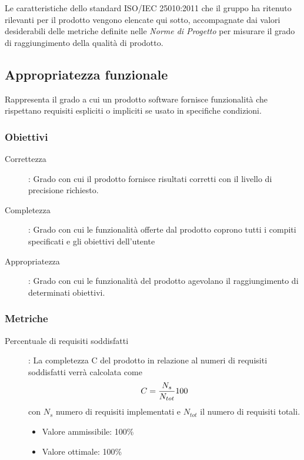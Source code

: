 \documentclass[../piano-di-qualifica.tex]{subfiles}
\begin{document}
Le caratteristiche dello standard ISO/IEC 25010:2011 che il gruppo ha ritenuto rilevanti per il prodotto vengono elencate qui sotto, accompagnate dai valori desiderabili delle metriche definite nelle \textit{Norme di Progetto} per misurare il grado di raggiungimento della qualità di prodotto.


\subsection{Appropriatezza funzionale}%
\label{sub:appropriatezza_funzionale}
  Rappresenta il grado a cui un prodotto software fornisce funzionalità che rispettano requisiti espliciti o impliciti se usato in specifiche condizioni.
  \subsubsection{Obiettivi}%
  \label{subs:obiettivi}
      \begin{description}
        \item [Correttezza]: Grado con cui il prodotto fornisce risultati corretti con il livello di precisione richiesto.
        \item [Completezza]: Grado con cui le funzionalità offerte dal prodotto coprono tutti i compiti specificati e gli obiettivi dell'utente
        \item [Appropriatezza]: Grado con cui le funzionalità del prodotto agevolano il raggiungimento di determinati obiettivi.
      \end{description}

  \subsubsection{Metriche}%
  \label{subs:metriche}
      \begin{description}
        \item [Percentuale di requisiti soddisfatti]: La completezza C del prodotto in relazione al numeri di requisiti soddisfatti verrà calcolata come \begin{equation} C = \frac{N_s}{N_{tot}}\\*100 \end{equation} con \(N_s\) numero di requisiti implementati e \(N_{tot}\) il numero di requisiti totali.
        \begin{itemize} \item Valore ammissibile: 100\% \item Valore ottimale: 100\% \end{itemize}
      \end{description}
\end{document}
